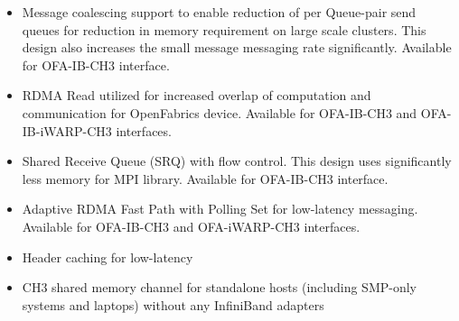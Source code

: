 \begin{itemize}
\begin{itemize}
      \item  Message coalescing support
      to enable reduction of per Queue-pair send queues for reduction
      in memory requirement on large scale clusters. This design also
      increases the small message messaging rate
      significantly. Available for OFA-IB-CH3
      interface. 


      \item  RDMA Read utilized for
      increased overlap of computation and communication for
      OpenFabrics device. Available for OFA-IB-CH3 and OFA-IB-iWARP-CH3
      interfaces. 

      \item  Shared Receive Queue (SRQ) with flow control. This design
      uses significantly less memory for MPI library. Available for
      OFA-IB-CH3 interface. 

      \item  Adaptive RDMA Fast Path with Polling Set for low-latency
      messaging. Available for OFA-IB-CH3 and OFA-iWARP-CH3
      interfaces. 

      \item  Header caching for low-latency

      \item  CH3 shared memory channel for 
      standalone hosts
      (including SMP-only systems and laptops) without any InfiniBand adapters
      

\end{itemize}
\end{itemize}
